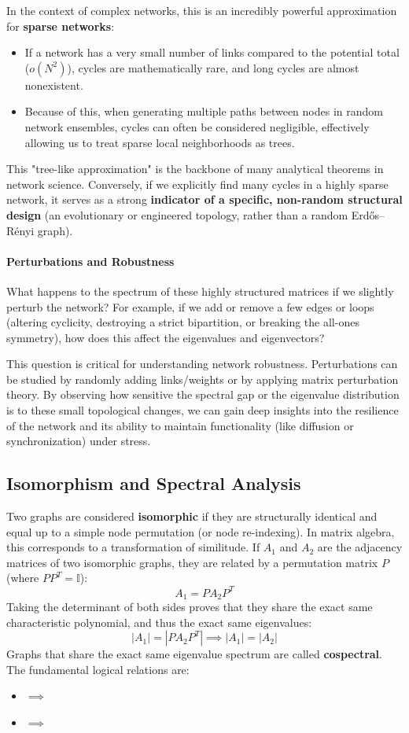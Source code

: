 In the context of complex networks, this is an incredibly powerful approximation for \textbf{sparse networks}:
\begin{itemize}
    \item If a network has a very small number of links compared to the potential total ($o(N^2)$), cycles are mathematically rare, and long cycles are almost nonexistent.
    \item Because of this, when generating multiple paths between nodes in random network ensembles, cycles can often be considered negligible, effectively allowing us to treat sparse local neighborhoods as trees.
\end{itemize}
This "tree-like approximation" is the backbone of many analytical theorems in network science. Conversely, if we explicitly find many cycles in a highly sparse network, it serves as a strong \textbf{indicator of a specific, non-random structural design} (an evolutionary or engineered topology, rather than a random Erdős–Rényi graph).

\paragraph{Perturbations and Robustness}
What happens to the spectrum of these highly structured matrices if we slightly perturb the network? For example, if we add or remove a few edges or loops (altering cyclicity, destroying a strict bipartition, or breaking the all-ones symmetry), how does this affect the eigenvalues and eigenvectors?

This question is critical for understanding network robustness. Perturbations can be studied by randomly adding links/weights or by applying matrix perturbation theory. By observing how sensitive the spectral gap or the eigenvalue distribution is to these small topological changes, we can gain deep insights into the resilience of the network and its ability to maintain functionality (like diffusion or synchronization) under stress.

\subsection{Isomorphism and Spectral Analysis}

Two graphs are considered \textbf{isomorphic} if they are structurally identical and equal up to a simple node permutation (or node re-indexing). In matrix algebra, this corresponds to a transformation of similitude. If $A_1$ and $A_2$ are the adjacency matrices of two isomorphic graphs, they are related by a permutation matrix $P$ (where $P P^T = \mathbb{I}$):
\[
    A_1 = P A_2 P^T
\]
Taking the determinant of both sides proves that they share the exact same characteristic polynomial, and thus the exact same eigenvalues:
\[
    |A_1| = |P A_2 P^T| \implies |A_1| = |A_2|
\]
Graphs that share the exact same eigenvalue spectrum are called \textbf{cospectral}. The fundamental logical relations are:
\begin{itemize}
    \item {} $\implies$ 
    \item {} $\implies$ 
\end{itemize}

